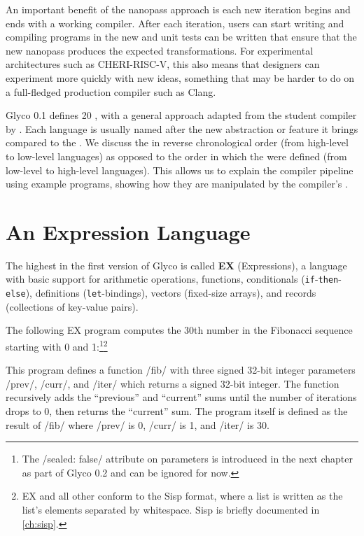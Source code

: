 \documentclass[main.tex]{subfiles}
\begin{document}
An important benefit of the nanopass approach is each new iteration begins and ends with a working compiler. After each iteration, users can start writing and compiling programs in the new  and unit tests can be written that ensure that the new \gls{nanopass} produces the expected transformations. For experimental architectures such as CHERI-RISC-V, this also means that designers can experiment more quickly with new ideas, something that may be harder to do on a full-fledged production compiler such as Clang.

Glyco 0.1 defines 20 , with a general approach adapted from the student compiler by \cite{compcourse}. Each language is usually named after the new abstraction or feature it brings compared to the . We discuss the  in reverse chronological order (from high-level to low-level languages) as opposed to the order in which the  were defined (from low-level to high-level languages). This allows us to explain the compiler pipeline using example programs, showing how they are manipulated by the compiler's .

\section{An Expression Language} \label{sct:ex}
The highest  in the first version of Glyco is called \textbf{EX} (Expressions), a language with basic support for arithmetic operations, functions, conditionals (\texttt{if}-\texttt{then}-\texttt{else}), definitions (\texttt{let}-bindings), vectors (fixed-size arrays), and records (collections of key-value pairs).

The following EX program computes the 30th number in the Fibonacci sequence starting with 0 and 1:\footnote{The \iil/sealed: false/ attribute on parameters is introduced in the next chapter as part of Glyco 0.2 and can be ignored for now.}\footnote{EX and all other  conform to the Sisp format, where a list is written as the list's elements separated by whitespace. Sisp is briefly documented in \cref{ch:sisp}.}

This program defines a function \iil/fib/ with three signed 32-bit integer parameters \iil/prev/, \iil/curr/, and \iil/iter/ which returns a signed 32-bit integer. The function recursively adds the \enquote{previous} and \enquote{current} sums until the number of iterations drops to 0, then returns the \enquote{current} sum. The program itself is defined as the result of \iil/fib/ where \iil/prev/ is 0, \iil/curr/ is 1, and \iil/iter/ is 30.
\end{document}
